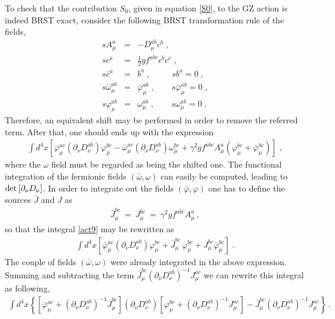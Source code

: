 To check that the contribution $S_{0}$, given in equation \eqref{S0}, to the GZ action is
indeed BRST exact, consider the following BRST transformation rule of the fields,
\begin{eqnarray}
\label{brst0}
sA^{a}_{\mu} &=& - D^{ab}_{\mu}c^{b}\;,\nonumber \\
s c^{a} &=& \frac{1}{2}gf^{abc}c^{b}c^{c} \;, \nonumber \\
s{\bar c}^{a} &=& b^{a}\;, \qquad \; \; 
sb^{a} = 0 \;, \nonumber \\
s{\bar \omega}^{ab}_\mu & = & {\bar \varphi}^{ab}_\mu \;, \qquad  s {\bar \varphi}^{ab}_\mu =0\;, \nonumber \\
s { \varphi}^{ab}_\mu&  = & {\omega}^{ab}_\mu  \;, \qquad s {\omega}^{ab}_\mu = 0 \;.
\end{eqnarray}
Therefore, an equivalent shift may be performed in order to remove the referred term.
After that, one should ends up with the expression
\begin{eqnarray}
\int d^{4}x \left[ 
{\bar \varphi}^{ac}_{\mu} (\partial_\nu D^{ab}_{\nu} )
\varphi^{bc}_{\mu} - {\bar \omega}^{ac}_{\mu}  (\partial_\nu D^{ab}_{\nu} ) \omega^{bc}_{\mu}
+\gamma^{2} gf^{abc}A^{a}_{\mu}(\varphi^{bc}_{\mu} + {\bar \varphi}^{bc}_{\mu})
\right]\;,
\label{act9}
\end{eqnarray}
where the $\omega$ field must be regarded as being the shifted one. The functional integration
of the fermionic fields $(\bar{\omega},\omega)$ can easily be computed, leading to 
$\det\left[ \partial_{\nu}D_{\nu} \right]$. In order to integrate out the fields
$(\bar{\varphi},\varphi)$ one has to define the sources $\bar{J}$ and $J$ as
\begin{eqnarray}
\bar{J}^{bc}_{\mu} ~=~ J^{bc}_{\mu} ~=~ \gamma^{2}gf^{abc}A^{a}_{\mu} 
\,,
\label{sourcesJJ}
\end{eqnarray}
so that the integral \eqref{act9} may be rewritten as
\begin{eqnarray}
\int d^{4}x \left[ 
{\bar \varphi}^{ac}_{\mu} (\partial_\nu D^{ab}_{\nu} ) \varphi^{bc}_{\mu} +
\bar{J}^{bc}_{\mu}\,\varphi^{bc}_{\mu} + J^{bc}_{\mu}\bar{\varphi}^{bc}_{\mu}
\right]\;.
\end{eqnarray}
The couple of fields $(\bar{\omega},\omega)$ were already integrated in the above expression.
Summing and subtracting the term 
$\bar{J}^{bc}_{\mu}(\partial_\nu D^{ab}_{\nu})^{-1}J^{ac}_{\mu}$ we can rewrite this integral
as following,
\begin{eqnarray}
\int d^{4}x \left\{ \left[ 
{\bar \varphi}^{ac}_{\mu}  + (\partial_\nu D^{ab}_{\nu} )^{-1}\bar{J}^{bc}_{\mu} \right]
(\partial_\nu D^{ab}_{\nu} )
\left[ \varphi^{bc}_{\mu} + (\partial_\nu D^{ab}_{\nu})^{-1} J^{ac}_{\mu} \right] -
\bar{J}^{bc}_{\mu}(\partial_\nu D^{ab}_{\nu})^{-1}J^{ac}_{\mu}
\right\}
\,.
\end{eqnarray}
